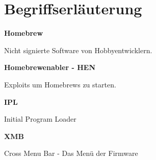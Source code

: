 \documentclass[mode=print,paper=screen,style=jefka]{powerdot}
\begin{document}
\section{Begriffserläuterung}
\begin{slide}{}
	\begin{large}\textbf{Homebrew}\end{large}\linebreak
	Nicht signierte Software von Hobbyentwicklern.\linebreak
	\linebreak
	\begin{large}\textbf{Homebrewenabler - HEN}\end{large}\linebreak
	Exploits um Homebrews zu starten.\linebreak
	\linebreak
	\begin{large}\textbf{IPL}\end{large}\linebreak
	Initial Program Loader\linebreak
	\linebreak
	\begin{large}\textbf{XMB}\end{large}\linebreak
	Cross Menu Bar - Das Menü der Firmware
\end{slide}



\end{document}
